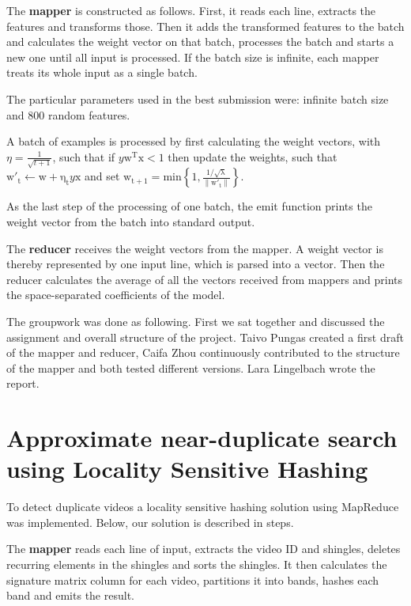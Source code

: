 \documentclass[a4paper, 11pt]{article}
\begin{document}
The \textbf{mapper} is constructed as follows. First, it reads each line, extracts the features and transforms those. Then it adds the transformed features to the batch and calculates the weight vector on that batch, processes the batch and starts a new one until all input is processed. If the batch size is infinite, each mapper treats its whole input as a single batch.

The particular parameters used in the best submission were: infinite batch size and 800 random features.

A batch of examples is processed by first calculating the weight vectors, with $\eta = \frac{1}{\sqrt{t +1}}$, such that if $y\mathrm{w^{T}x} < 1$ then update the weights, such that $\mathrm{w'_{t}} \leftarrow\mathrm{w + \eta _{t}}y \mathrm{x}$ and set $\mathrm{w_{t+1}} = \mathrm{min \left \{1,\frac{1/\sqrt{\lambda }}{\left \| w'_{t} \right \|} \right \}}$.

As the last step of the processing of one batch, the emit function prints the weight vector from the batch into standard output.

The \textbf{reducer} receives the weight vectors from the mapper. A weight vector is thereby represented by one input line, which is parsed into a vector. Then the reducer calculates the average of all the vectors received from mappers and prints the space-separated coefficients of the model.

The groupwork was done as following. First we sat together and discussed the assignment and overall structure of the project. Taivo Pungas created a first draft of the mapper and reducer, Caifa Zhou continuously contributed to the structure of the mapper and both tested different versions. Lara Lingelbach wrote the report. \pagebreak

\section*{Approximate near-duplicate search using Locality Sensitive Hashing} 

To detect duplicate videos a locality sensitive hashing solution using MapReduce was implemented.
Below, our solution is described in steps.

The \textbf{mapper} reads each line of input, extracts the video ID and shingles, deletes recurring elements in the shingles and sorts the shingles. It then calculates the signature matrix column for each video, partitions it into bands, hashes each band and emits the result.
\end{document}
